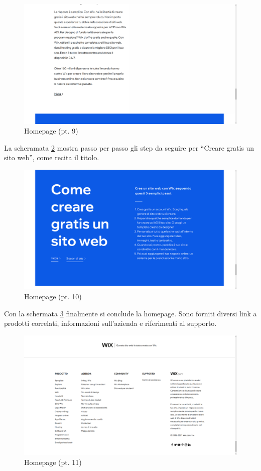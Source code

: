 \documentclass[11pt,a4paper]{article}
\begin{document}
\begin{figure}[H]
  \centering
  \includegraphics[width=1\textwidth]{img/homepage-09.png}
  \caption{Homepage (pt. 9)}
  \label{fig:homepage-09}
\end{figure}

La scheramata \ref{fig:homepage-10} mostra passo per passo gli step da
seguire per ``Creare gratis un sito web'', come recita il titolo.

\begin{figure}[H]
  \centering
  \includegraphics[width=1\textwidth]{img/homepage-10.png}
  \caption{Homepage (pt. 10)}
  \label{fig:homepage-10}
\end{figure}

Con la schermata \ref{fig:homepage-11} finalmente si conclude la
homepage. Sono forniti diversi link a prodotti correlati, informazioni
sull'azienda e riferimenti al supporto.

\begin{figure}[H]
  \centering
  \includegraphics[width=1\textwidth]{img/homepage-11.png}
  \caption{Homepage (pt. 11)}
  \label{fig:homepage-11}
\end{figure}
\end{document}
